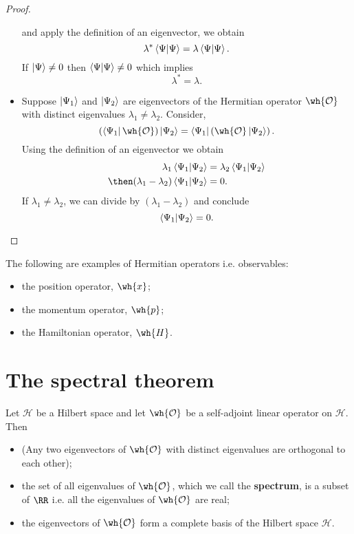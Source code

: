 \documentclass[12pt, a4paper]{article}
\begin{document}
\begin{proof}
\begin{itemize}
        and apply the definition of an eigenvector, we obtain 
        \[\lambda^* \bra{\Psi}\ket{\Psi} = \lambda \bra{\Psi}\ket{\Psi}.\] 
        If \(\ket{\Psi} \neq 0\) then \(\bra{\Psi} \ket{\Psi} \neq 0\) which implies
        \[\lambda^*=\lambda.\]
        \item Suppose \(\ket{\Psi_1}\) and \(\ket{\Psi_2}\) are eigenvectors of the Hermitian operator \(\wh{\mathcal{O}}\) with distinct eigenvalues \(\lambda_1 \neq \lambda_2\). Consider,
        \[\left( \bra{\Psi_1} \wh{\mathcal{O}} \right) \ket{\Psi_2} = \bra{\Psi_1} \left( \wh{\mathcal{O}} \ket{\Psi_2} \right).\]
        Using the definition of an eigenvector we obtain 
        \[\begin{aligned}
            \lambda_1 \bra{\Psi_1} \ket{\Psi_2} &= \lambda_2 \bra{\Psi_1} \ket{\Psi_2} \\
            \then (\lambda_1-\lambda_2) \bra{\Psi_1} \ket{\Psi_2} &= 0.
        \end{aligned}\]
        If \(\lambda_1 \neq \lambda_2\), we can divide by \((\lambda_1-\lambda_2)\) and conclude 
        \[\bra{\Psi_1}\ket{\Psi_2} =0.\]
    \end{itemize}
\end{proof}

\begin{mdexample}
    The following are examples of Hermitian operators i.e. observables:
    \begin{itemize}
        \item the position operator, \(\wh{x}\);
        \item the momentum operator, \(\wh{p}\);
        \item the Hamiltonian operator, \(\wh{H}\).
    \end{itemize}
\end{mdexample}

\section{The spectral theorem}

\begin{mdthm}
    Let \(\mathcal{H}\) be a Hilbert space and let \(\wh{\mathcal{O}}\) be a self-adjoint linear operator on \(\mathcal{H}\). Then 
    \begin{itemize}
        \item (Any two eigenvectors of \(\wh{\mathcal{O}}\) with distinct eigenvalues are orthogonal to each other);
        \item the set of all eigenvalues of \(\wh{\mathcal{O}}\), which we call the \textbf{spectrum}, is a subset of \(\RR\) i.e. all the eigenvalues of \(\wh{\mathcal{O}}\) are real;
        \item the eigenvectors of \(\wh{\mathcal{O}}\) form a complete basis of the Hilbert space \(\mathcal{H}\).
    \end{itemize}
\end{mdthm}
\end{document}
